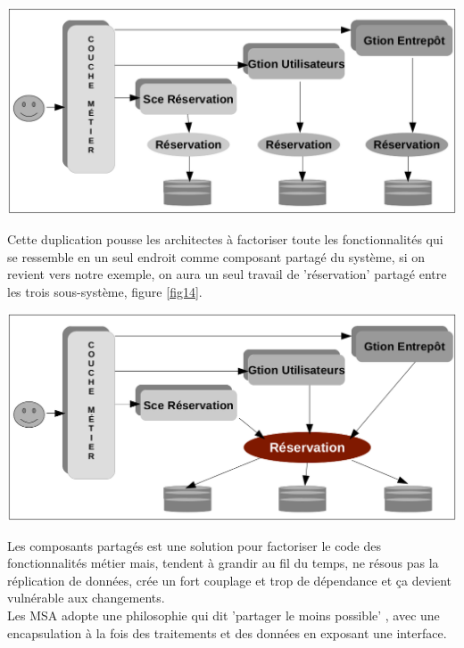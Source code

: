 \documentclass[12pt, a4paper, openany]{report}
\begin{document}
   \begin{center}
     \includegraphics[scale=0.3]{compos_partag1_13.png}
     \label{fig13}
   \end{center}
    
    Cette duplication pousse les architectes à factoriser toute les fonctionnalités qui se ressemble en un seul endroit comme composant partagé du système, si on revient vers notre exemple, on aura un seul travail de 'réservation' partagé entre les trois sous-système, figure \ref{fig14}.
        
   \begin{center}
     \includegraphics[scale=0.3]{compos_paratag2_14.png}
     \label{fig14}
   \end{center}
    
   Les composants partagés est une solution pour factoriser le code des fonctionnalités métier mais, tendent à grandir au fil du temps, ne résous pas la réplication de données, crée un fort couplage et trop de dépendance et ça devient vulnérable aux changements.\\
   
   Les MSA adopte une philosophie qui dit 'partager le moins possible' \cite{refbib6} , avec une encapsulation à la fois des traitements et des données en exposant une interface.\\
   
\end{document}
